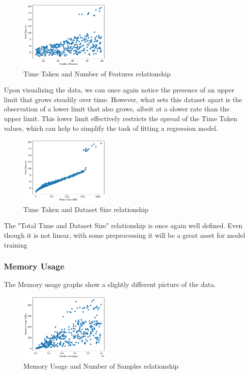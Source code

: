 \documentclass[conference]{IEEEtran}
\begin{document}
  \begin{figure}[ht]
      \centering
    \includegraphics[width=0.4\textwidth]{plots/experiment_results/random_forest_time_features.pdf}
      \caption{Time Taken and Number of Features relationship}
    \end{figure}


Upon visualizing the data, we can once again notice the presence of an upper limit that grows steadily over time. However, what sets this dataset apart is the observation of a lower limit that also grows, albeit at a slower rate than the upper limit. This lower limit effectively restricts the spread of the Time Taken values, which can help to simplify the task of fitting a regression model.

      
  \begin{figure}[ht]
      \centering
  \includegraphics[width=0.4\textwidth]{plots/experiment_results/random_forest_time_dataset_size.pdf}
      \caption{Time Taken and Dataset Size relationship}
  \end{figure}

  The "Total Time and Dataset Size" relationship is once again well defined. Even though it is not linear, with some preprocessing it will be a great asset for model training

\vfill
\subsubsection{\textbf{Memory Usage}}
The Memory usage graphs show a slightly different picture of the data.

\begin{figure}[h]
\centering
\includegraphics[width=0.4\textwidth]{plots/experiment_results/random_forest_memory_samples.pdf}
\caption{Memory Usage and Number of Samples relationship}
\end{figure}
\end{document}
